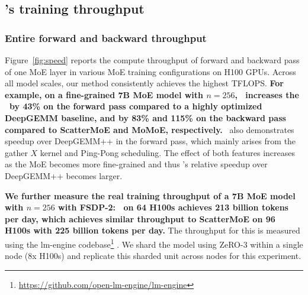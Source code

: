 \subsection{\Algname's training throughput}  \label{sec:exp:speed}



\subsubsection{Entire forward and backward throughput}
Figure~\ref{fig:speed} reports the compute throughput of forward and backward pass of one MoE layer in various MoE training configurations on H100 GPUs. Across all model scales, our method consistently achieves the highest TFLOPS. \textbf{For example, on a fine-grained 7B MoE model with $n=256$, \Algname~increases the \tflops~by 43\% on the forward pass compared to a highly optimized DeepGEMM baseline, and by 83\% and 115\% on the backward pass compared to ScatterMoE and MoMoE, respectively.} \Algname~also demonstrates speedup over DeepGEMM++ in the forward pass, which mainly arises from the gather $X$ kernel and Ping-Pong scheduling. The effect of both features increases as the MoE becomes more fine-grained and thus \Algname's relative speedup over DeepGEMM++ becomes larger.


\textbf{We further measure the real training throughput of a 7B MoE model with $n=256$ with FSDP-2: \algname\ on 64 H100s achieves 213 billion tokens per day, which achieves similar throughput to ScatterMoE on 96 H100s with 225 billion tokens per day.} The throughput for this is measured using the lm-engine codebase\footnote{\scriptsize\url{https://github.com/open-lm-engine/lm-engine}} \citep{Mishra_lm_engine_A_2024}. We shard the model using ZeRO-3 within a single node (8x H100s) and replicate this sharded unit across nodes for this experiment.

